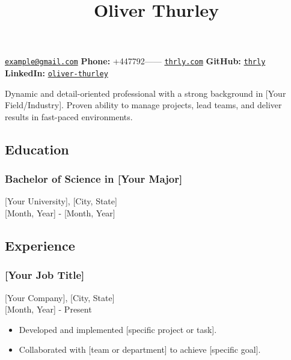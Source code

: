 \documentclass[11pt,a4paper]{article}
\title{\textcolor{devblue}{\large Oliver Thurley}}
\author{}
\date{}
\providecommand{\tightlist}{%
  \setlength{\itemsep}{0pt}\setlength{\parskip}{0pt}}
\begin{document}
\maketitle

\vspace{-1em}
\noindent\href{mailto:example@gmail.com}{\texttt{example@gmail.com}} \hspace{1em}
\textbf{Phone:} +447792------ \hspace{1em}
\href{https://thrly.com}{\texttt{thrly.com}} \hspace{1em}
\textbf{GitHub:} \href{https://github.com/thrly}{\texttt{thrly}} \hspace{1em}
\textbf{LinkedIn:} \href{https://linkedin.com/in/oliver-thurley}{\texttt{oliver-thurley}}

\vspace{1em}

Dynamic and detail-oriented professional with a strong background in
{[}Your Field/Industry{]}. Proven ability to manage projects, lead
teams, and deliver results in fast-paced environments.

\subsection{Education}\label{education}

\subsubsection{Bachelor of Science in {[}Your
Major{]}}\label{bachelor-of-science-in-your-major}

{[}Your University{]}, {[}City, State{]}\\
{[}Month, Year{]} - {[}Month, Year{]}

\subsection{Experience}\label{experience}

\subsubsection{{[}Your Job Title{]}}\label{your-job-title}

{[}Your Company{]}, {[}City, State{]}\\
{[}Month, Year{]} - Present

\begin{itemize}
\tightlist
\item
  Developed and implemented {[}specific project or task{]}.
\item
  Collaborated with {[}team or department{]} to achieve {[}specific
  goal{]}.
\end{itemize}
\end{document}
